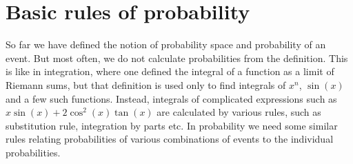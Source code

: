 \documentclass[preprint,  11pt]{amsart}
\theoremstyle{plain} %
\theoremstyle{definition} %
\newtheorem{problem}[theorem]{Problem}
\begin{document}
{{{{{{{{{{{%





\section{Basic rules of probability}
So far we have defined the notion of probability space and probability of an event. But most often, we do not calculate probabilities from the definition. This is like in integration, where one defined the integral of a function as a limit of Riemann sums, but that definition is used only to find integrals of $x^{n}$, $\sin(x)$ and a few such functions. Instead, integrals of complicated expressions such as $x\sin(x)+2\cos^{2}(x)\tan(x)$ are calculated by various rules, such as substitution rule, integration by parts etc. In probability we need some similar rules relating probabilities of various combinations of events to the individual probabilities.


}}}}}}}}}}}
\end{document}
